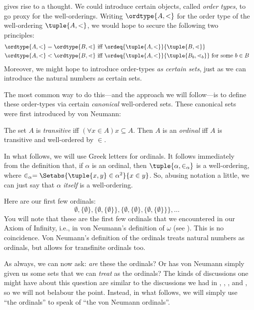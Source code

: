 \documentclass[../../../include/open-logic-section]{subfiles}
\begin{document}

 gives rise to a
thought. We could introduce certain objects, called \emph{order
types}, to go proxy for the well-orderings. Writing $\ordtype{A, <}$
for the order type of the well-ordering $\tuple{A, <}$, we would hope
to secure the following two principles:
\begin{align*}
	\ordtype{A, <} = \ordtype{B, \lessdot} & 
	\text{ iff } \ordeq{\tuple{A, <}}{\tuple{B, \lessdot}}\\
	\ordtype{A, <} < \ordtype{B, \lessdot}&
	\text{ iff }\ordeq{\tuple{A, <}}{\tuple{B_b, \lessdot_b}}\text{ for some }b \in B
\end{align*}
Moreover, we might hope to introduce order-types \emph{as certain
sets}, just as we can introduce the natural numbers as certain sets. 

The most common way to do this---and the approach we will follow---is
to define these order-types via certain \emph{canonical} well-ordered
sets. These canonical sets were first introduced by von Neumann:

\begin{defn}
The set $A$ is \emph{transitive} {iff} $(\forall x \in A)x \subseteq
A$. Then $A$ is an \emph{ordinal} {iff} $A$ is transitive and
well-ordered by $\in$.
\end{defn}

In what follows, we will use Greek letters for ordinals. It follows
immediately from the definition that, if $\alpha$ is an ordinal, then
$\tuple{\alpha, \in_\alpha}$ is a well-ordering, where $\in_\alpha =
\Setabs{\tuple{x, y} \in \alpha^2}{x \in y}$. So, abusing notation a
little, we can just say that $\alpha$ \emph{itself} is a
well-ordering. 

Here are our first few ordinals:
\[
	\emptyset, \{\emptyset\}, 
	\{\emptyset, \{\emptyset\}\}, 
	\{\emptyset, \{\emptyset\}, \{\emptyset, \{\emptyset\}\}\}, \ldots
\]
You will note that these are the first few ordinals that we
encountered in our Axiom of Infinity, i.e., in von Neumann's
definition of $\omega$ (see ). This
is no coincidence. Von Neumann's definition of the ordinals treats
natural numbers as ordinals, but allows for transfinite ordinals too. 

As always, we can now ask: \emph{are} these the ordinals? Or has von
Neumann simply given us some sets that we can \emph{treat} as the
ordinals? The kinds of discussions one might have about this question
are similar to the discussions we had in ,
,
, and
, so we will not belabour the point.
Instead, in what follows, we will simply use ``the ordinals'' to speak
of ``the von Neumann ordinals''. 
\end{document}
